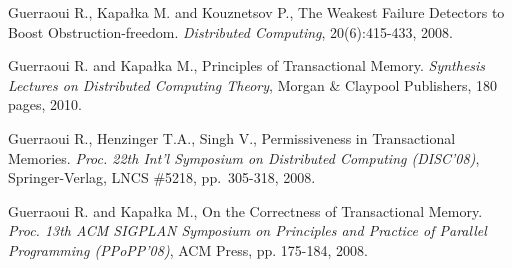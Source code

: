 \begin{thebibliography}{99}
{%





Guerraoui R., Kapa\l{}ka M. and  Kouznetsov P., 
The Weakest Failure Detectors to Boost Obstruction-freedom. 
{\it Distributed Computing}, 20(6):415-433, 2008. 


Guerraoui R. and  Kapa\l{}ka M.,
Principles of Transactional Memory. 
{\it Synthesis Lectures on Distributed Computing Theory},
 Morgan \& Claypool Publishers, 180 pages, 2010. 




Guerraoui R., Henzinger T.A., Singh V.,
Permissiveness  in Transactional Memories. 
{\em Proc. 22th Int'l Symposium on Distributed Computing (DISC'08)},
Springer-Verlag, LNCS \#5218, pp.~305-318, 2008.


% 
% 




Guerraoui R. and Kapa\l{}ka M., 
On the Correctness of Transactional Memory. 
{\it Proc. 13th ACM SIGPLAN Symposium on Principles and Practice of 
Parallel Programming (PPoPP'08)}, ACM Press, pp. 175-184, 2008. 

}
\end{thebibliography}

